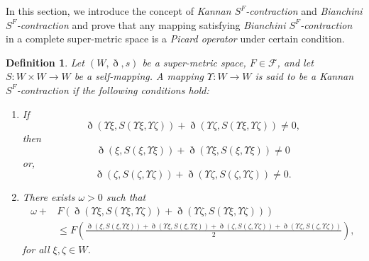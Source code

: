 \documentclass[pdflatex,sn-mathphys-num]{sn-jnl}%
\theoremstyle{thmstyleone}%
\theoremstyle{thmstyletwo}%
\theoremstyle{thmstylethree}%
\newtheorem{definition}{Definition}%
\begin{document}
In this section, we introduce the concept of \textit{Kannan $S^F$-contraction} and \textit{Bianchini $S^F$-contraction} and prove that any mapping satisfying \textit{Bianchini $S^F$-contraction} in a complete super-metric space is a \textit{Picard operator} under certain condition.

\begin{definition}\label{ksf definition}
Let $(W,\eth,s)$ be a super-metric space, $F \in \mathcal{F}$, and let 
$S : W \times W \to W$ be a self-mapping. A mapping $\Upsilon  : W \to W$ 
is said to be a \emph{\textit{Kannan $S^F$-contraction}} if the following conditions hold:
\begin{enumerate}
    \item[(i)] 
    If 
    \[
    \eth(\Upsilon \xi,S(\Upsilon \xi,\Upsilon \zeta)) + \eth(\Upsilon \zeta,S(\Upsilon \xi,\Upsilon \zeta)) \neq 0,
    \]
    then
    \[
    \eth(\xi,S(\xi,\Upsilon \xi )) + \eth(\Upsilon \xi,S(\xi,\Upsilon \xi )) \neq 0
    \]
    or,
    \[
    \eth(\zeta ,S(\zeta,\Upsilon \zeta)) + \eth(\Upsilon \zeta,S(\zeta,\Upsilon \zeta)) \neq 0.
    \]

    \item[(ii)] 
    There exists $\omega   > 0$ such that
    \begin{equation}\label{ksf contraction}
    \begin{aligned}
    \omega   + &F(\eth(\Upsilon \xi, S(\Upsilon \xi,\Upsilon \zeta)) + \eth(\Upsilon \zeta, S(\Upsilon \xi,\Upsilon \zeta))) \\
    &\le 
    F\left(
    \frac{
    \eth(\xi,S(\xi,\Upsilon \xi )) + \eth(\Upsilon \xi,S(\xi,\Upsilon \xi )) 
    + \eth(\zeta ,S(\zeta,\Upsilon \zeta)) + \eth(\Upsilon \zeta,S(\zeta,\Upsilon \zeta))
    }{2}
    \right),
    \end{aligned}
    \end{equation}
    for all $\xi,\zeta \in W$.
\end{enumerate}
\end{definition}
\end{document}
